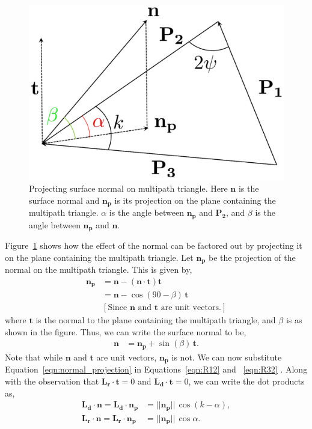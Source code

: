 \begin{figure}
\centering
		\includegraphics[width=0.8\columnwidth]{content/images/MultipathTriangle/MultipathTriangle_Normal.png}
		\caption{Projecting surface normal on multipath triangle. Here $\mathbf{n}$ is the surface normal and $\mathbf{n_p}$ is its projection on the plane containing the multipath triangle. $\alpha$ is the angle between $\mathbf{n_p}$ and $\mathbf{P_2}$, and $\beta$ is the angle between $\mathbf{n_p}$ and $\mathbf{n}$.}
		\label{fig:multipath_normals}
\end{figure}

Figure~\ref{fig:multipath_normals} shows how the effect of the normal can be factored out by projecting it on the plane containing the multipath triangle.
Let $\mathbf{n_p}$ be the projection of the normal on the multipath triangle.
This is given by,
%
\begin{align}
%
\mathbf{n_p} & = \mathbf{n} - \left(\mathbf{n} \cdot \mathbf{t}\right) \mathbf{t}\nonumber\\
& = \mathbf{n} - \cos(90 - \beta) \, \mathbf{t}\nonumber\\
& \left[\text{Since $\mathbf{n}$ and $\mathbf{t}$ are unit vectors.}\right]\nonumber
%
\end{align}
%
where $\mathbf{t}$ is the normal to the plane containing the multipath triangle, and $\beta$ is as shown in the figure.
Thus, we can write the surface normal to be,
%
\begin{align}
\mathbf{n} & = \mathbf{n_p} + \sin(\beta) \, \mathbf{t}.
\label{eqn:normal_projection}
\end{align}
%
Note that while $\mathbf{n}$ and $\mathbf{t}$ are unit vectors, $\mathbf{n_p}$ is not.
We can now substitute Equation~\ref{eqn:normal_projection} in Equations~\ref{eqn:R12} and ~\ref{eqn:R32} .
Along with the observation that $\mathbf{L_r} \cdot \mathbf{t} = 0$ and $\mathbf{L_d} \cdot \mathbf{t} = 0$,
we can write the dot products as,
%
\begin{align}
\mathbf{L_d} \cdot \mathbf{n} = \mathbf{L_d} \cdot \mathbf{n_p} &= ||\mathbf{n_p}|| \,
\cos(k - \alpha),\nonumber\\
\mathbf{L_r} \cdot \mathbf{n} = \mathbf{L_r} \cdot \mathbf{n_p} &= ||\mathbf{n_p}|| \, \cos{\alpha}\nonumber.
\end{align}
%

